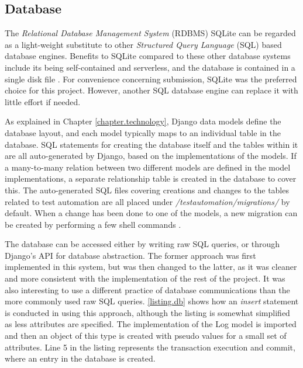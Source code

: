 \subsection{Database}

The \emph{Relational Database Management System} (RDBMS) SQLite can be regarded as a light-weight substitute to other \emph{Structured Query Language} (SQL) based database engines. Benefits to SQLite compared to these other database systems include its being self-contained and serverless, and the database is contained in a single disk file \cite{https://www.sqlite.org/about.html}. For convenience concerning submission, SQLite was the preferred choice for this project. However, another SQL database engine can replace it with little effort if needed.

As explained in Chapter \ref{chapter.technology}, Django data models define the database layout, and each model typically maps to an individual table in the database. SQL statements for creating the database itself and the tables within it are all auto-generated by Django, based on the implementations of the models. If a many-to-many relation between two different models are defined in the model implementations, a separate relationship table is created in the database to cover this. The auto-generated SQL files covering creations and changes to the tables related to test automation are all placed under \emph{/testautomation/migrations/} by default. When a change has been done to one of the models, a new migration can be created by performing a few shell commands \cite{https://docs.djangoproject.com/en/1.9/topics/migrations/}.

The database can be accessed either by writing raw SQL queries, or through Django's API for database abstraction. The former approach was first implemented in this system, but was then changed to the latter, as it was cleaner and more consistent with the implementation of the rest of the project. It was also interesting to use a different practice of database communications than the more commonly used raw SQL queries. \lstlistingname \space \ref{listing.db} shows how an \emph{insert} statement is conducted in \toolname \space using this approach, although the listing is somewhat simplified as less attributes are specified. The implementation of the Log model is imported and then an object of this type is created with pseudo values for a small set of attributes. Line 5 in the listing represents the transaction execution and commit, where an entry in the database is created.

